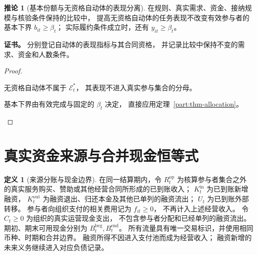 \documentclass[UTF8,12pt,a4paper,openany,fontset=none,zihao=false]{ctexrep}
\theoremstyle{definition}
\newtheorem{definition}{定义}[chapter]
\newtheorem{corollary}{推论}[chapter]
\newenvironment{certificate}{\par\noindent\textbf{证书。}\ignorespaces}{\par}
\newcommand{\1}{\mathbf 1}
\begin{document}
\begin{corollary}[基本份额与无资格自动体的表现分离]
\label{part:cor-machine-performance}
在规则、真实需求、资金、接纳规模与核验条件保持的比较中，
提高无资格自动体的任务表现不改变有效参与者的基本下界
\(b_{it}\ge\beta_t\)；
实际履约条件成立时，还有 \(y_{it}\ge\beta_t\)。
\end{corollary}
\begin{certificate}
分别登记自动体的表现指标与其合同资格，
并记录比较中保持不变的需求、资金和人数条件。
\end{certificate}
\begin{proof}
\begin{semanticsteps}
\item 无资格自动体不属于 \(\mathcal E_t^\ast\)，
其表现不进入真实参与集合的分母。
\item 基本下界由有效完成与固定的 \(\beta_t\) 决定，
直接应用定理~\ref{part:thm-allocation}。
\end{semanticsteps}
\end{proof}

\section{真实资金来源与合并现金恒等式}

\begin{definition}[来源分账与现金边界]
\label{part:def-funds}
在同一结算期内，令 \(R_t^{\mathrm{op}}\) 为核算参与者集合之外
的真实服务购买、赞助或其他经营合同所形成的已到账收入；
\(K_t^{\mathrm{in}}\) 为已到账新增融资，
\(K_t^{\mathrm{out}}\) 为融资退出、归还本金及其他已单列的融资流出；
\(U_t\) 为已到账外部转移。
参与者向组织支付的相关费用记为 \(f_{it}\ge0\)，
不再计入上述经营收入。
令 \(C_t\ge0\) 为组织的真实运营现金支出，
不包含参与者分配和已经单列的融资流出。
期初、期末可用现金分别为 \(B_t^{\mathrm{beg}},B_t^{\mathrm{end}}\)。
所有流量具有唯一交易标识，并使用相同币种、时期和合并边界。
融资所得不因进入支付池而成为经营收入；
融资新增的未来义务继续进入对应负债记录。
\end{definition}
\end{document}
